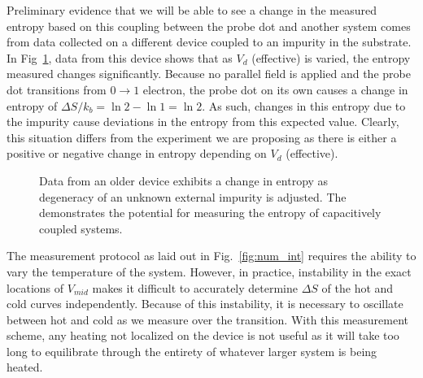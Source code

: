 Preliminary evidence that we will be able to see a change in the measured entropy based on this coupling between the probe dot and another system comes from data collected on a different device coupled to an impurity in the substrate. In Fig~\ref{fig:sshape}, data from this device shows that as $V_d$ (effective) is varied, the entropy measured changes significantly. Because no parallel field is applied and the probe dot transitions from $0 \to 1$ electron, the probe dot on its own causes a change in entropy of $\Delta S/k_b = \ln 2 - \ln 1 = \ln 2 $. As such, changes in this entropy due to the impurity cause deviations in the entropy from this expected value. Clearly, this situation differs from the experiment we are proposing as there is either a positive or negative change in entropy depending on $V_d$ (effective). 

\begin{figure}[h]
\centering
{}
\caption{ Data from an older device exhibits a change in entropy as degeneracy of an unknown external impurity is adjusted. The demonstrates the potential for measuring the entropy of capacitively coupled systems.}

\label{fig:sshape}       %
\end{figure}


The measurement protocol as laid out in Fig.~\ref{fig:num_int} requires the ability to vary the temperature of the system. However, in practice, instability in the exact locations of $V_{mid}$ makes it difficult to accurately determine $\Delta S$ of the hot and cold curves independently. Because of this instability, it is necessary to oscillate between hot and cold as we measure over the transition. With this measurement scheme, any heating not localized on the device is not useful as it will take too long to equilibrate through the entirety of whatever larger system is being heated.

